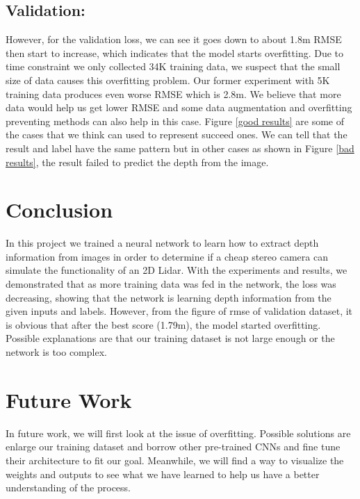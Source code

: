 \documentclass[10pt,twocolumn,letterpaper]{article}
\begin{document}
\subsection{Validation:}
However, for the validation loss, we can see it goes down to about 1.8m RMSE then start to increase, which indicates that the model starts overfitting. Due to time constraint we only collected 34K training data, we suspect that the small size of data causes this overfitting problem. Our former experiment with 5K training data produces even worse RMSE which is 2.8m. We believe that more data would help us get lower RMSE and some data augmentation and overfitting preventing methods can also help in this case. Figure \ref{good results} are some of the cases that we think can used to represent succeed ones. We can tell that the result and label have the same pattern but in other cases as shown in Figure \ref{bad results}, the result failed to predict the depth from the image.


\section{Conclusion}
In this project we trained a neural network to learn how to extract depth information from images in order to determine if a cheap stereo camera can simulate the functionality of an 2D Lidar. With the experiments and results, we demonstrated that as more training data was fed in the network, the loss was decreasing, showing that the network is learning depth information from the given inputs and labels. However, from the figure of rmse of validation dataset, it is obvious that after the best score (1.79m), the model started overfitting. Possible explanations are that our training dataset is not large enough or the network is too complex. 

\section{Future Work}

In future work, we will first look at the issue of overfitting. Possible solutions are enlarge our training dataset and borrow other pre-trained CNNs and fine tune their architecture to fit our goal. Meanwhile, we will find a way to visualize the weights and outputs to see what we have learned to help us have a better understanding of the process. 

{\small


}
\end{document}
